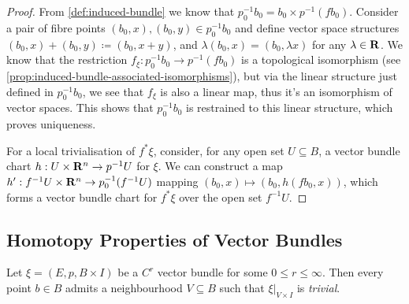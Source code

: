 \documentclass[../../../deep-dive]{subfile}
\begin{document}
\begin{proof}
From \cref{def:induced-bundle} we know that
\(p_0^{-1} b_0 = b_0 \times p^{-1} (f b_0)\). Consider a pair of fibre points
\((b_0, x), (b_0, y) \in p_0^{-1} b_0\) and define vector space structures
\((b_0, x) + (b_0, y) \coloneq (b_0, x + y)\), and
\(\lambda (b_0, x) = (b_0, \lambda x)\) for any \(\lambda \in \mathbf{R}\). We know that
the restriction \(f_{\xi}: p_0^{-1} b_0 \to p^{-1}(f b_0)\) is a topological
isomorphism (see \cref{prop:induced-bundle-associated-isomorphisms}), but via
the linear structure just defined in \(p_0^{-1} b_0\), we see that \(f_{\xi}\)
is also a linear map, thus it's an isomorphism of vector spaces. This shows that
\(p_0^{-1} b_0\) is restrained to this linear structure, which proves uniqueness.

For a local trivialisation of \(f^{*} \xi\), consider, for any open set \(U
\subseteq B\), a vector bundle chart \(h: U \times \mathbf{R}^n \to p^{-1} U\) for
\(\xi\). We can construct a map \(h': f^{-1} U \times \mathbf{R}^n \to
p_0^{-1}(f^{-1} U)\) mapping \((b_0, x) \mapsto (b_0, h(f b_0, x))\), which
forms a vector bundle chart for \(f^{*} \xi\) over the open set \(f^{-1} U\).
\end{proof}

\subsection{Homotopy Properties of Vector Bundles}

\begin{lemma}
\label{lem:local-trivialization}
Let \(\xi = (E, p, B \times I)\) be a \(C^r\) vector bundle for some
\(0 \leq r \leq \infty\). Then every point \(b \in B\) admits a neighbourhood
\(V \subseteq B\) such that \(\xi|_{V \times I}\) is \emph{trivial}.
\end{lemma}
\end{document}

